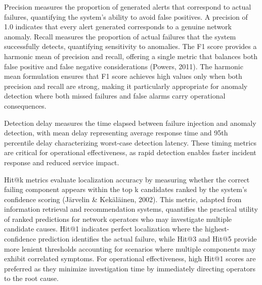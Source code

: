 \documentclass[11pt]{article}
\begin{document}
Precision measures the proportion of generated alerts that correspond to actual failures, quantifying the system's ability to avoid false positives. A precision of 1.0 indicates that every alert generated corresponds to a genuine network anomaly. Recall measures the proportion of actual failures that the system successfully detects, quantifying sensitivity to anomalies. The F1 score provides a harmonic mean of precision and recall, offering a single metric that balances both false positive and false negative considerations (Powers, 2011). The harmonic mean formulation ensures that F1 score achieves high values only when both precision and recall are strong, making it particularly appropriate for anomaly detection where both missed failures and false alarms carry operational consequences.

Detection delay measures the time elapsed between failure injection and anomaly detection, with mean delay representing average response time and 95th percentile delay characterizing worst-case detection latency. These timing metrics are critical for operational effectiveness, as rapid detection enables faster incident response and reduced service impact.

Hit@k metrics evaluate localization accuracy by measuring whether the correct failing component appears within the top k candidates ranked by the system's confidence scoring (Järvelin \& Kekäläinen, 2002). This metric, adapted from information retrieval and recommendation systems, quantifies the practical utility of ranked predictions for network operators who may investigate multiple candidate causes. Hit@1 indicates perfect localization where the highest-confidence prediction identifies the actual failure, while Hit@3 and Hit@5 provide more lenient thresholds accounting for scenarios where multiple components may exhibit correlated symptoms. For operational effectiveness, high Hit@1 scores are preferred as they minimize investigation time by immediately directing operators to the root cause.
\end{document}

